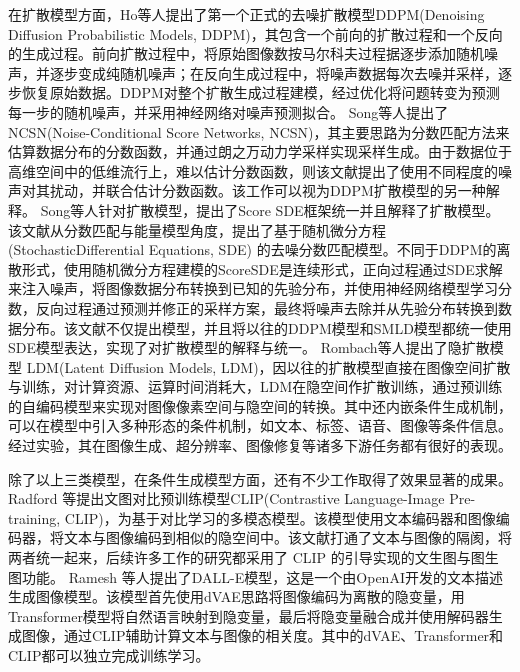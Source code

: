 \par
在扩散模型方面，Ho\cite{hoDenoisingDiffusionProbabilistic2020}等人提出了第一个正式的去噪扩散模型DDPM(Denoising Diffusion Probabilistic Models, DDPM)，其包含一个前向的扩散过程和一个反向的生成过程。前向扩散过程中，将原始图像数按马尔科夫过程据逐步添加随机噪声，并逐步变成纯随机噪声；在反向生成过程中，将噪声数据每次去噪并采样，逐步恢复原始数据。DDPM对整个扩散生成过程建模，经过优化将问题转变为预测每一步的随机噪声，并采用神经网络对噪声预测拟合。
Song\cite{songGenerativeModelingEstimating2019}等人提出了NCSN(Noise-Conditional Score Networks, NCSN)，其主要思路为分数匹配方法来估算数据分布的分数函数，并通过朗之万动力学采样实现采样生成。由于数据位于高维空间中的低维流行上，难以估计分数函数，则该文献提出了使用不同程度的噪声对其扰动，并联合估计分数函数。该工作可以视为DDPM扩散模型的另一种解释。
Song\cite{songScoreBasedGenerativeModeling2021}等人针对扩散模型，提出了Score SDE框架统一并且解释了扩散模型。该文献从分数匹配与能量模型角度，提出了基于随机微分方程(StochasticDifferential Equations, SDE) 的去噪分数匹配模型。不同于DDPM的离散形式，使用随机微分方程建模的ScoreSDE是连续形式，正向过程通过SDE求解来注入噪声，将图像数据分布转换到已知的先验分布，并使用神经网络模型学习分数，反向过程通过预测并修正的采样方案，最终将噪声去除并从先验分布转换到数据分布。该文献不仅提出模型，并且将以往的DDPM模型和SMLD模型都统一使用SDE模型表达，实现了对扩散模型的解释与统一。
Rombach\cite{rombachHighResolutionImageSynthesis2022}等人提出了隐扩散模型 LDM(Latent Diffusion Models, LDM)，因以往的扩散模型直接在图像空间扩散与训练，对计算资源、运算时间消耗大，LDM在隐空间作扩散训练，通过预训练的自编码模型来实现对图像像素空间与隐空间的转换。其中还内嵌条件生成机制，可以在模型中引入多种形态的条件机制，如文本、标签、语音、图像等条件信息。经过实验，其在图像生成、超分辨率、图像修复等诸多下游任务都有很好的表现。
\par
除了以上三类模型，在条件生成模型方面，还有不少工作取得了效果显著的成果。Radford \cite{pmlr-v139-radford21a}等提出文图对比预训练模型CLIP(Contrastive Language-Image Pre-training, CLIP)，为基于对比学习的多模态模型。该模型使用文本编码器和图像编码器，将文本与图像编码到相似的隐空间中。该文献打通了文本与图像的隔阂，将两者统一起来，后续许多工作的研究都采用了 CLIP 的引导实现的文生图与图生图功能。
Ramesh \cite{pmlr-v139-ramesh21a}等人提出了DALL-E模型，这是一个由OpenAI开发的文本描述生成图像模型。该模型首先使用dVAE思路将图像编码为离散的隐变量，用Transformer模型将自然语言映射到隐变量，最后将隐变量融合成并使用解码器生成图像，通过CLIP辅助计算文本与图像的相关度。其中的dVAE、Transformer和CLIP都可以独立完成训练学习。
\par
